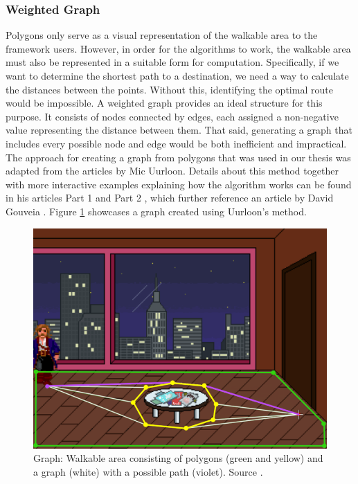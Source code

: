 
\subsubsection{Weighted Graph}
\label{Analysis:Graph}
Polygons only serve as a visual representation of the walkable area to the framework users. However, in order for the algorithms to work, the walkable area must also be represented in a suitable form for computation. Specifically, if we want to determine the shortest path to a destination, we need a way to calculate the distances between the points. Without this, identifying the optimal route would be impossible. A weighted graph provides an ideal structure for this purpose. It consists of nodes connected by edges, each assigned a non-negative value representing the distance between them. That said, generating a graph that includes every possible node and edge would be both inefficient and impractical. The approach for creating a graph from polygons that was used in our thesis was adapted from the articles by Mic Uurloon. Details about this method together with more interactive examples explaining how the algorithm works can be found in his articles Part 1 \cite{Uurloon1} and Part 2 \cite{Uurloon2}, which further reference an article by David Gouveia \cite{Gouveia}.
Figure \ref{fig:Graph}
showcases a graph created using Uurloon's method.
\begin{figure}[H]
\centering
\includegraphics[width=.6\linewidth]{img/WS-polygons3.png}
\caption{Graph: Walkable area consisting of polygons (green and yellow) and a graph (white) with a possible path (violet). Source \cite{Uurloon1}.}
\label{fig:Graph}
\end{figure}

